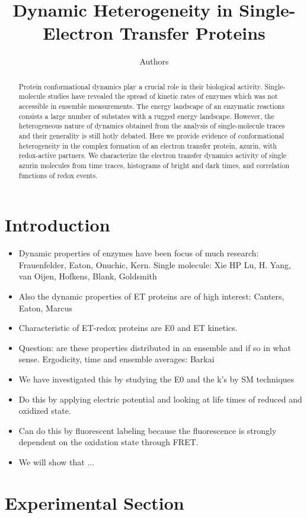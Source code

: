 \documentclass[journal=jacsat,manuscript=article]{achemso}
\author{Authors}
\affiliation{Huygens-Kamerlingh Onnes Laboratory, Leiden University, RA, Leiden, The Netherlands}
\title[]
{Dynamic Heterogeneity in Single-Electron Transfer Proteins}
\begin{document}
\begin{abstract}
	Protein conformational dynamics play a crucial role in their biological activity. Single-molecule studies have revealed the spread of kinetic rates of enzymes which was not accessible in ensemble measurements.
	The energy landscape of an enzymatic reactions consists a large number of substates with a rugged energy landscape.
	However, the heterogeneous nature of dynamics obtained from the analysis of single-molecule traces and their generality is still hotly debated. Here we provide evidence of conformational heterogeneity in the complex formation of an electron transfer protein, azurin, with redox-active partners. We characterize the electron transfer dynamics activity of single azurin molecules from time traces, histograms of bright and dark times, and correlation functions of redox events. 
\end{abstract}
\section{Introduction}
\begin{itemize}
	\item Dynamic properties of enzymes have been focus of much research: Frauenfelder, Eaton, Onuchic, Kern. Single molecule: Xie HP Lu, H. Yang, van Oijen, Hofkens, Blank, Goldsmith
	\item Also the dynamic properties of ET proteins are of high interest: Canters, Eaton, Marcus
	\item Characteristic of ET-redox proteins are E0 and ET kinetics.
	\item Question: are these properties distributed in an ensemble and if so in what sense. Ergodicity, time and ensemble averages: Barkai
	\item We have investigated this by studying the E0 and the k's by SM techniques
	\item Do this by applying electric potential and looking at life times of reduced and oxidized state.
	\item Can do this by fluorescent labeling because the fluorescence is strongly dependent on the oxidation state through FRET.
	\item We will show that $...$
\end{itemize}
\section{Experimental Section}
\end{document}
